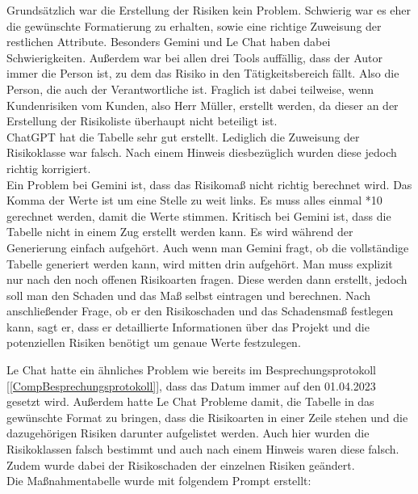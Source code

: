 Grundsätzlich war die Erstellung der Risiken kein Problem. Schwierig war es eher die gewünschte Formatierung zu erhalten, 
sowie eine richtige Zuweisung der restlichen Attribute. Besonders Gemini und Le Chat haben dabei Schwierigkeiten. 
Außerdem war bei allen drei Tools auffällig, dass der Autor immer die Person ist, zu dem das Risiko in den 
Tätigkeitsbereich fällt. Also die Person, die auch der Verantwortliche ist. Fraglich ist dabei teilweise, wenn 
Kundenrisiken vom Kunden, also Herr Müller, erstellt werden, da dieser an der Erstellung der Risikoliste überhaupt 
nicht beteiligt ist.\\

ChatGPT hat die Tabelle sehr gut erstellt. Lediglich die Zuweisung der Risikoklasse war falsch. Nach einem Hinweis 
diesbezüglich wurden diese jedoch richtig korrigiert.\\

Ein Problem bei Gemini ist, dass das Risikomaß nicht richtig berechnet wird. Das Komma der Werte ist um eine Stelle zu 
weit links. Es muss alles einmal *10 gerechnet werden, damit die Werte stimmen. Kritisch bei Gemini ist, dass die Tabelle 
nicht in einem Zug erstellt werden kann. Es wird während der Generierung einfach aufgehört. Auch wenn man Gemini fragt, 
ob die vollständige Tabelle generiert werden kann, wird mitten drin aufgehört. Man muss explizit nur nach den noch offenen
Risikoarten fragen. Diese werden dann erstellt, jedoch soll man den Schaden und das Maß selbst eintragen und berechnen.
Nach anschließender Frage, ob er den Risikoschaden und das Schadensmaß festlegen kann, sagt er, dass er detaillierte 
Informationen über das Projekt und die potenziellen Risiken benötigt um genaue Werte festzulegen.

Le Chat hatte ein ähnliches Problem wie bereits im Besprechungsprotokoll [\autoref{CompBesprechungsprotokoll}], dass das 
Datum immer auf den 01.04.2023 gesetzt wird. Außerdem hatte Le Chat Probleme damit, die Tabelle in das gewünschte Format
zu bringen, dass die Risikoarten in einer Zeile stehen und die dazugehörigen Risiken darunter aufgelistet werden. Auch 
hier wurden die Risikoklassen falsch bestimmt und auch nach einem Hinweis waren diese falsch. Zudem wurde dabei der 
Risikoschaden der einzelnen Risiken geändert.\\

Die Maßnahmentabelle wurde mit folgendem Prompt erstellt:


